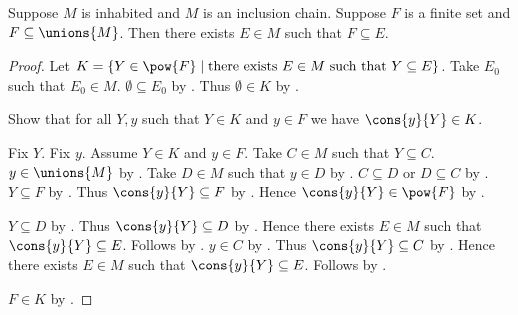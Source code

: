 \begin{theorem}\label{finite_subset_of_chain_union}
    Suppose $M$ is inhabited and $M$ is an inclusion chain.
    Suppose $F$ is a finite set and $F\subseteq\unions{M}$.
    Then there exists $E\in M$ such that $F\subseteq E$.
\end{theorem}
\begin{proof}
    Let $K=\{Y\in\pow{F}\mid
        \text{there exists $E\in M$ such that $Y\subseteq E$}\}$.
    Take $E_0$ such that $E_0\in M$.
    $\emptyset\subseteq E_0$ by .
    Thus $\emptyset\in K$ by .

    Show that for all $Y,y$ such that $Y\in K$ and $y\in F$ we have
        $\cons{y}{Y}\in K$.
    \begin{subproof}
        Fix $Y$.
        Fix $y$.
        Assume $Y\in K$ and $y\in F$.
        Take $C\in M$ such that $Y\subseteq C$.
        $y\in\unions{M}$ by .
        Take $D\in M$ such that $y\in D$ by .
        $C\subseteq D$ or $D\subseteq C$ by .
        $Y\subseteq F$ by .
        Thus $\cons{y}{Y}\subseteq F$ by .
        Hence $\cons{y}{Y}\in\pow{F}$ by .
        \begin{byCase}
            $Y\subseteq D$ by .
            Thus $\cons{y}{Y}\subseteq D$ by .
            Hence there exists $E\in M$ such that $\cons{y}{Y}\subseteq E$.
            Follows by \auto.
            $y\in C$ by .
            Thus $\cons{y}{Y}\subseteq C$ by .
            Hence there exists $E\in M$ such that $\cons{y}{Y}\subseteq E$.
            Follows by \auto.
        \end{byCase}
    \end{subproof}
    $F\in K$ by .
\end{proof}

